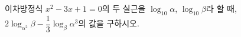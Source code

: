이차방정식 $x^2-3x+1=0$의 두 실근을 $\log_{10} \alpha$, $\log_{10} \beta$라 할 때, $2\log_{\alpha^2} \beta-\dfrac{1}{3}\log_\beta \alpha^3$의 값을 구하시오. 

